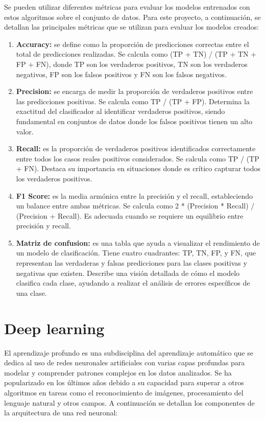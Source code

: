 Se pueden utilizar diferentes métricas para evaluar los modelos entrenados con estos algoritmos sobre el conjunto de datos. Para este proyecto, a continuación, se detallan las principales métricas que se utilizan para evaluar los modelos creados:

\begin{enumerate}
    \item \textbf{Accuracy:} se define como la proporción de predicciones correctas entre el total de predicciones realizadas. Se calcula como (TP + TN) / (TP + TN + FP + FN), donde TP son los verdaderos positivos, TN son los verdaderos negativos, FP son los falsos positivos y FN son los falsos negativos. 
    \item \textbf{Precision:} se encarga de medir la proporción de verdaderos positivos entre las predicciones positivas. Se calcula como TP / (TP + FP). Determina la exactitud del clasificador al identificar verdaderos positivos, siendo fundamental en conjuntos de datos donde los falsos positivos tienen un alto valor.
    \item \textbf{Recall:} es la proporción de verdaderos positivos identificados correctamente entre todos los casos reales positivos considerados. Se calcula como TP / (TP + FN). Destaca su importancia en situaciones donde es crítico capturar todos los verdaderos positivos.
    \item \textbf{F1 Score:} es la media armónica entre la precisión y el recall, estableciendo un balance entre ambas métricas. Se calcula como 2 * (Precision * Recall) / (Precision + Recall). Es adecuada cuando se requiere un equilibrio entre precisión y recall.
    \item \textbf{Matriz de confusion:} es una tabla que ayuda a visualizar el rendimiento de un modelo de clasificación. Tiene cuatro cuadrantes: TP, TN, FP, y FN, que representan las verdaderas y falsas predicciones para las clases positivas y negativas que existen. Describe una visión detallada de cómo el modelo clasifica cada clase, ayudando a realizar el análisis de errores específicos de una clase.
\end{enumerate}





\section{Deep learning}
El aprendizaje profundo es una subdisciplina del aprendizaje automático que se dedica al uso de redes neuronales artificiales con varias capas profundas para modelar y comprender patrones complejos en los datos analizados. Se ha popularizado en los últimos años debido a su capacidad para superar a otros algoritmos en tareas como el reconocimiento de imágenes, procesamiento del lenguaje natural y otros campos. A continuación se detallan los componentes de la arquitectura de una red neuronal:

